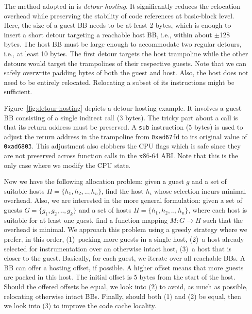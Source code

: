 The method adopted in {\bcov} is \textit{detour hosting}.
It significantly reduces the relocation overhead while preserving the stability of code references at basic-block level.
Here, the size of a guest BB needs to be at least 2 bytes, which is enough to insert a short detour targeting a reachable host BB, i.e., within about $\pm$128 bytes.
The host BB must be large enough to accommodate two regular detours, i.e., at least 10 bytes.
The first detour targets the host trampoline while the other detours would target the trampolines of their respective guests.
Note that we can safely overwrite padding bytes of both the guest and host.
Also, the host does not need to be entirely relocated.
Relocating a subset of its instructions might be sufficient.


Figure~\ref{fig:detour-hosting} depicts a detour hosting example.
It involves a guest BB consisting of a single indirect \textsf{call} (3 bytes).
The tricky part about a \textsf{call} is that its return address must be preserved.
A \texttt{sub} instruction (5 bytes) is used to adjust the return address in the trampoline from \texttt{0xad67fd} to its original value of \texttt{0xad6803}.
This adjustment also clobbers the CPU flags which is safe since they are not preserved across function calls in the x86-64 ABI.
Note that this is the only case where we modify the CPU state.

Now we have the following allocation problem: given a guest $g$ and a set of suitable hosts $H=\{h_1,h_2,..,h_n\}$, find the host $h_i$ whose selection incurs minimal overhead.
Also, we are interested in the more general formulation: given a set of guests $G=\{g_1,g_2,..,g_k\}$ and a set of hosts $H=\{h_1,h_2,..,h_n\}$, where each host is suitable for at least one guest, find a function mapping $M:G\rightarrow H$ such that the overhead is minimal.
We approach this problem using a greedy strategy where we prefer, in this order,
(1)~packing more guests in a single host,
(2)~a host already selected for instrumentation over an otherwise intact host,
(3)~a host that is closer to the guest.
Basically, for each guest, we iterate over all reachable BBs.
A BB can offer a hosting offset, if possible.
A higher offset means that more guests are packed in this host.
The initial offset is 5 bytes from the start of the host.
Should the offered offsets be equal, we look into (2) to avoid, as much as possible, relocating otherwise intact BBs.
Finally, should both (1) and (2) be equal, then we look into (3) to improve the code cache locality.

